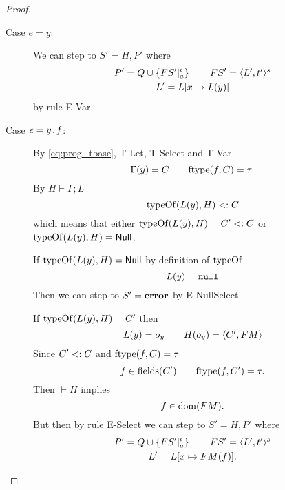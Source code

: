 \begin{proof}
\begin{description}
\begin{description}
        \item[Case $e = y$:]
          We can step to $S' = H, P'$ where
          \begin{equation*}
            \begin{gathered}
              P' = Q \cup \left\{FS'|_a^\iota \right\} \quad\quad FS' = \mbox{$\langle L',
              t' \rangle^s$} \\
              L' = L[x \mapsto L(y)]
            \end{gathered}
          \end{equation*}
          by rule {\sc E-Var}. \contradiction

        \item[Case $e = \mbox{\mdseries$y$\texttt{.}$f$}$:]
          By \eqref{eq:prog_tbase}, {\sc T-Let}, {\sc T-Select} and {\sc T-Var}
          \begin{equation*}
            \Gamma(y) = C \quad\quad \mbox{$\mathrm{ftype}$}(f, C) = \tau.
          \end{equation*}
          By $H \vdash \Gamma;L$
          \begin{equation*}
            \mbox{$\mathrm{typeOf}$}(L(y), H) <: C
          \end{equation*}
          which means that either $\mbox{$\mathrm{typeOf}$}(L(y), H) = C' <: C$ or \\
          $\mbox{$\mathrm{typeOf}$}(L(y), H) = \mbox{$\mathsf{Null}$}$. 
          
          If $\mbox{$\mathrm{typeOf}$}(L(y), H) = \mbox{$\mathsf{Null}$}$ by definition of $\mbox{$\mathrm{typeOf}$}$
          \begin{equation*}
            L(y) = \mbox{\mdseries\texttt{null}}
          \end{equation*}
          Then we can step to $S' = \mbox{{\bf error}}$ by {\sc E-NullSelect}.
          \contradiction

          If $\mbox{$\mathrm{typeOf}$}(L(y), H) = C'$ then
          \begin{equation*}
            L(y) = o_y \quad\quad H(o_y) = \mbox{$\langle C', FM \rangle$}
          \end{equation*}
          Since $C' <: C$ and $\mbox{$\mathrm{ftype}$}(f, C) = \tau$
          \begin{equation*}
            f \in \mbox{$\mathrm{fields}$}(C') \quad\quad \mbox{$\mathrm{ftype}$}(f, C') = \tau.
          \end{equation*}
          Then $\vdash H$ implies
          \begin{equation*}
            f \in \mbox{$\mathrm{dom}$}(FM).
          \end{equation*}
          But then by rule {\sc E-Select} we can step to $S' = H, P'$ where
          \begin{equation*}
            \begin{gathered}
              P' = Q \cup \left\{FS'|_a^\iota \right\} \quad\quad FS' = \mbox{$\langle L',
              t' \rangle^s$} \\
              L' = L[x \mapsto FM(f)].
            \end{gathered}
          \end{equation*}
          \contradiction


\end{description}
\end{description}
\end{proof}
